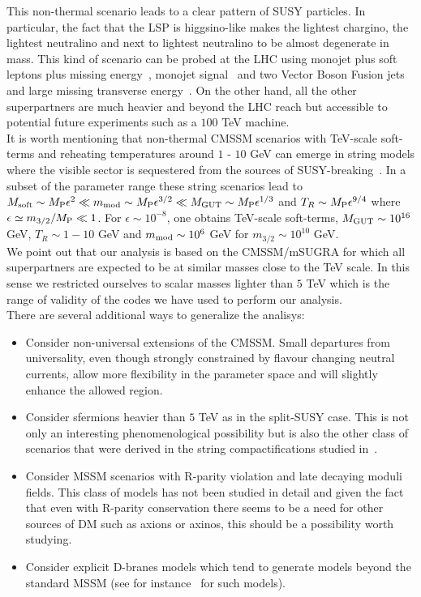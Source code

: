 \documentclass[12pt,a4paper]{book}
\begin{document}
This non-thermal scenario leads to a clear pattern of SUSY particles. In particular, the fact that the LSP is higgsino-like makes the lightest chargino, the lightest neutralino and next to lightest neutralino to be almost degenerate in mass. This kind of scenario can be probed at the LHC using monojet plus soft leptons plus missing energy~\cite{Baer:2014kya, Han:2014kaa}, monojet signal~\cite{Han:2013usa} and two Vector Boson Fusion jets and large missing transverse energy~\cite{Han:2013usa}. On the other hand, all the other superpartners are much heavier and beyond the LHC reach but accessible to potential future experiments such as a $100$ TeV machine.\\

It is worth mentioning that non-thermal CMSSM scenarios with TeV-scale soft-terms and reheating temperatures around $1$ - $10$ GeV can emerge in string models where the visible sector is sequestered from the sources of SUSY-breaking~\cite{Aparicio:2014wxa, Blumenhagen:2009gk}. In a subset of the parameter range these string scenarios lead to $M_{\rm soft}\sim M_{\rm P} \epsilon^2 \ll m_{\rm mod}\sim M_{\rm P} \epsilon^{3/2} \ll M_{\rm GUT} \sim M_{\rm P} \epsilon^{1/3}$ and $T_R\sim M_{\rm P} \epsilon^{9/4}$ where $\epsilon \simeq m_{3/2}/M_{\rm P}\ll 1$. For $\epsilon \sim 10^{-8}$, one obtains TeV-scale soft-terms, $M_{\rm GUT}\sim 10^{16}$ GeV, $T_R\sim 1 -10$ GeV and $m_{\rm mod}\sim 10^6$ GeV for $m_{3/2}\sim 10^{10}$ GeV.\\

We point out that our analysis is based on the CMSSM/mSUGRA for which all superpartners are expected to be at similar masses close to the TeV scale. In this sense we restricted ourselves to scalar masses lighter than $5$ TeV which is the range of validity of the codes we have used to perform our analysis.\\

There are several additional ways to generalize the analisys:
\begin{itemize}
\item Consider non-universal extensions of the CMSSM. Small departures from universality, even though strongly constrained by flavour changing neutral currents, allow more flexibility in the parameter space and will slightly enhance the allowed region.
\item Consider sfermions heavier than $5$ TeV as in the split-SUSY case. This is not only an interesting phenomenological possibility but is also the other class of scenarios that were derived in the string compactifications studied in~\cite{Aparicio:2014wxa, Blumenhagen:2009gk}.
\item Consider MSSM scenarios with R-parity violation and late decaying moduli fields. This class of models has not been studied in detail and given the fact that even with R-parity conservation there seems to be a need for other sources of DM such as axions or axinos, this should be a possibility worth studying.
\item Consider explicit D-branes models which tend to generate models beyond the standard MSSM (see for instance~\cite{Dolan:2011qu, Maharana:2012tu, Krippendorf:2010hj} for such models).
\end{itemize}
\end{document}
